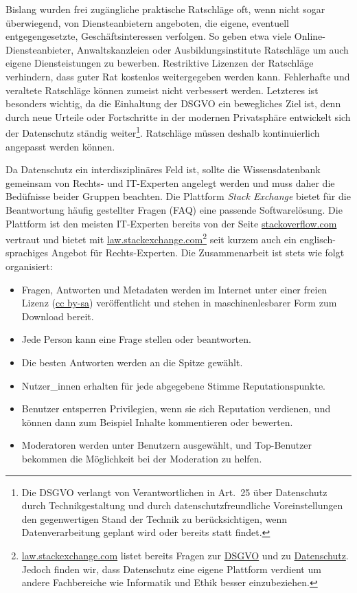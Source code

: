 \documentclass{scrlttr2}
\let\tightlist\relax
\begin{document}
\begin{letter}{}
Bislang wurden frei zugängliche praktische Ratschläge oft, wenn nicht
sogar überwiegend, von Diensteanbietern angeboten, die eigene, eventuell
entgegengesetzte, Geschäftsinteressen verfolgen. So geben etwa
viele Online-Diensteanbieter, Anwaltskanzleien oder Ausbildungsinstitute
Ratschläge um auch eigene Diensteistungen zu bewerben. Restriktive
Lizenzen der Ratschläge verhindern, dass guter Rat kostenlos
weitergegeben werden kann. Fehlerhafte und veraltete Ratschläge können
zumeist nicht verbessert werden. Letzteres ist besonders wichtig, da die
Einhaltung der DSGVO ein bewegliches Ziel ist, denn durch neue Urteile
oder Fortschritte in der modernen Privatsphäre entwickelt sich der
Datenschutz ständig weiter\footnote{Die DSGVO verlangt von
  Verantwortlichen in Art.~25 über Datenschutz durch Technikgestaltung
  und durch datenschutzfreundliche Voreinstellungen den gegenwertigen
  Stand der Technik zu berücksichtigen, wenn Datenverarbeitung geplant
  wird oder bereits statt findet.}. Ratschläge müssen deshalb
kontinuierlich angepasst werden können.

Da Datenschutz ein interdisziplinäres Feld ist, sollte die
Wissensdatenbank gemeinsam von Rechts- und IT-Experten angelegt werden
und muss daher die Bedüfnisse beider Gruppen beachten. Die Plattform
\emph{Stack Exchange} bietet für die Beantwortung häufig gestellter
Fragen (FAQ) eine passende Softwarelösung. Die Plattform ist den meisten
IT-Experten bereits von der Seite
\href{https://stackoverflow.com}{stackoverflow.com} vertraut und bietet
mit
\href{https://law.stackexchange.com}{law.stackexchange.com}\footnote{\href{https://law.stackexchange.com}{law.stackexchange.com}
  listet bereits Fragen zur
  \href{https://law.stackexchange.com/questions/tagged/gdpr}{DSGVO} und zu
  \href{https://law.stackexchange.com/questions/tagged/gdpr+data-protection}{Datenschutz}.
  Jedoch finden wir, dass Datenschutz eine eigene Plattform verdient um
  andere Fachbereiche wie Informatik und Ethik besser einzubeziehen.}
seit kurzem auch ein englisch-sprachiges Angebot für Rechts-Experten.
Die Zusammenarbeit ist stets wie folgt organisiert:

\begin{itemize}
\tightlist
\item
  Fragen, Antworten und Metadaten werden im Internet unter einer freien
  Lizenz (\href{https://creativecommons.org/licenses/by-sa/3.0/}{cc
  by-sa}) veröffentlicht und stehen in maschinenlesbarer Form zum
  Download bereit.
\item
  Jede Person kann eine Frage stellen oder beantworten.
\item
  Die besten Antworten werden an die Spitze gewählt.
\item
  Nutzer\_innen erhalten für jede abgegebene Stimme Reputationspunkte.
\item
  Benutzer entsperren Privilegien, wenn sie sich Reputation verdienen,
  und können dann zum Beispiel Inhalte kommentieren oder bewerten.
\item
  Moderatoren werden unter Benutzern ausgewählt, und Top-Benutzer
  bekommen die Möglichkeit bei der Moderation zu helfen.
\end{itemize}


\end{letter}
\end{document}
